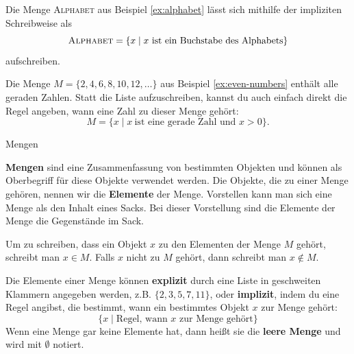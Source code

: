 \documentclass[../../main.tex]{subfiles}
\begin{document}
\begin{example}{}
    Die Menge \textsc{Alphabet} aus Beispiel \ref{ex:alphabet} lässt sich mithilfe der impliziten Schreibweise als
    \[\textsc{Alphabet}=\{x\mid x~\text{ist~ein~Buchstabe~des~Alphabets}\}\]
    aufschreiben.
\end{example}

\begin{example}{}
    Die Menge $M=\{2,4,6,8,10,12,\dots\}$ aus Beispiel \ref{ex:even-numbers} enthält alle geraden Zahlen. Statt die Liste aufzuschreiben, kannst du auch einfach direkt die Regel angeben, wann eine Zahl zu dieser Menge gehört:
    \[M=\{x\mid x~\text{ist~eine~gerade~Zahl~und~}x>0\}.\]
\end{example}

\begin{nutshell}{Mengen}

    \textbf{Mengen} sind eine Zusammenfassung von bestimmten Objekten und können als Oberbegriff für diese Objekte verwendet werden. Die Objekte, die zu einer Menge gehören, nennen wir die \textbf{Elemente} der Menge. Vorstellen kann man sich eine Menge als den Inhalt eines Sacks. Bei dieser Vorstellung sind die Elemente der Menge die Gegenstände im Sack.

    Um zu schreiben, dass ein Objekt $x$ zu den Elementen der Menge $M$ gehört, schreibt man $x\in M$. Falls $x$ nicht zu $M$ gehört, dann schreibt man $x\notin M$.

    Die Elemente einer Menge können \textbf{explizit} durch eine Liste in geschweiten Klammern angegeben werden, z.B. $\{2,3,5,7,11\}$,
    oder \textbf{implizit}, indem du eine Regel angibst, die bestimmt, wann ein bestimmtes Objekt $x$ zur Menge gehört:
    \[\{x\mid \text{Regel,~wann~}x\text{~zur~Menge~gehört}\}\]
    Wenn eine Menge gar keine Elemente hat, dann heißt sie die \textbf{leere Menge} und wird mit $\emptyset$ notiert.
\end{nutshell}
\end{document}
